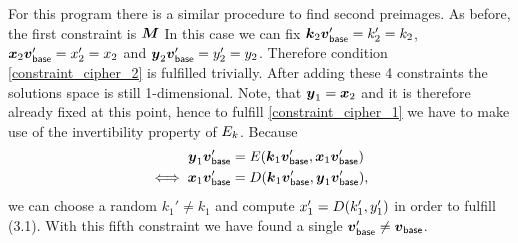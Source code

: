 \begin{pchstack}[center, space=2cm]
\end{pchstack}
For this program there is a similar procedure to find second preimages.
As before, the first constraint is $\boldsymbol{M} $
In this case we can fix $\boldsymbol k_2 \boldsymbol v_{\mathsf{base}}' = k_2' = k_2$, $\boldsymbol x_2 \boldsymbol v_{\mathsf{base}}' = x_2' = x_2$ and $\boldsymbol y_2 \boldsymbol v_{\mathsf{base}}' = y_2' = y_2$.
Therefore condition \eqref{constraint_cipher_2} is fulfilled trivially.
After adding these 4 constraints the solutions space is still 1-dimensional.
Note, that $\boldsymbol y_1 = \boldsymbol x_2$ and it is therefore already fixed at this point,
hence to fulfill \eqref{constraint_cipher_1} we have to make use of the invertibility property of $E_k$.
Because
\begin{align*}
    \boldsymbol y_1 \boldsymbol v_{\mathsf{base}}' &= E(\boldsymbol k_1 \boldsymbol v_{\mathsf{base}}', \boldsymbol x_1 \boldsymbol v_{\mathsf{base}}') \\
    \iff \boldsymbol x_1 \boldsymbol v_{\mathsf{base}}' &= D(\boldsymbol k_1 \boldsymbol v_{\mathsf{base}}', \boldsymbol y_1 \boldsymbol v_{\mathsf{base}}'),
\end{align*}
we can choose a random $k_1' \neq k_1$ and compute $x_1' = D(k_1', y_1')$ in order to fulfill (3.1).
With this fifth constraint we have found a single $\boldsymbol v_{\mathsf{base}}' \neq \boldsymbol v_{\mathsf{base}}$.

